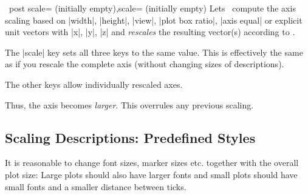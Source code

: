 \begin{pgfplotsxykeylist}{\x\ post scale= (initially empty),scale= (initially empty)}
	Lets \PGFPlots\ compute the axis scaling based on |width|, |height|, |view|, |plot box ratio|, |axis equal| or explicit unit vectors with |x|, |y|, |z| and \emph{rescales} the resulting vector(s) according to .

	The |scale| key sets all three keys to the same  value.	This is effectively the same as if you rescale the complete axis (without changing sizes of descriptions).

	The other keys allow individually rescaled axes.
\begin{codeexample}[]
\end{codeexample}
	Thus, the axis becomes \emph{larger}. This overrules any previous scaling.

\begin{codeexample}[]
\end{codeexample}
\end{pgfplotsxykeylist}

\subsection{Scaling Descriptions: Predefined Styles}
\label{sec:scaling:styles}
It is reasonable to change font sizes, marker sizes etc. together with the overall plot size: Large plots should also have larger fonts and small plots should have small fonts and a smaller distance between ticks.

